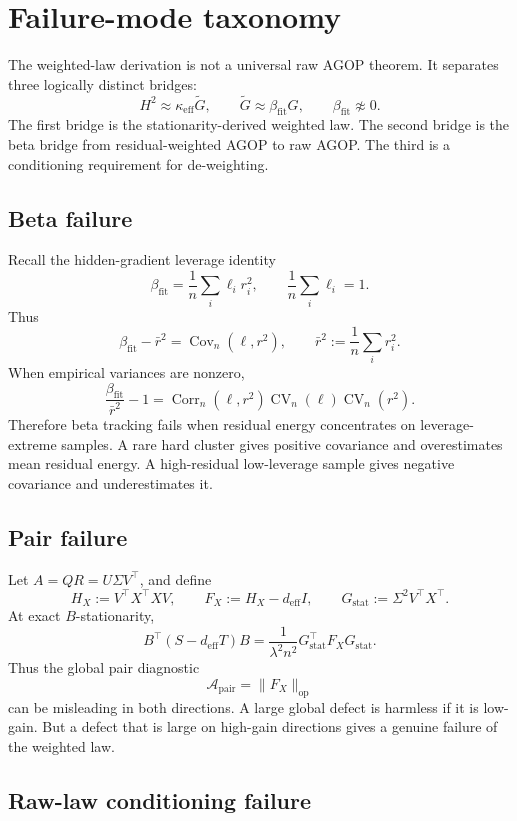 \section{Failure-mode taxonomy}
\label{sec:failure-modes}

The weighted-law derivation is not a universal raw AGOP theorem. It separates
three logically distinct bridges:
\[
H^2\approx \kappa_{\mathrm{eff}}\widetilde G,
\qquad
\widetilde G\approx \beta_{\mathrm{fit}}G,
\qquad
\beta_{\mathrm{fit}}\not\approx 0.
\]
The first bridge is the stationarity-derived weighted law. The second bridge is
the beta bridge from residual-weighted AGOP to raw AGOP. The third is a
conditioning requirement for de-weighting.

\subsection{Beta failure}

Recall the hidden-gradient leverage identity
\[
\beta_{\mathrm{fit}}
=
\frac1n\sum_i\ell_i r_i^2,
\qquad
\frac1n\sum_i\ell_i=1.
\]
Thus
\[
\beta_{\mathrm{fit}}-\bar r^2
=
\operatorname{Cov}_n(\ell,r^2),
\qquad
\bar r^2:=\frac1n\sum_i r_i^2.
\]
When empirical variances are nonzero,
\[
\frac{\beta_{\mathrm{fit}}}{\bar r^2}-1
=
\operatorname{Corr}_n(\ell,r^2)
\operatorname{CV}_n(\ell)
\operatorname{CV}_n(r^2).
\]
Therefore beta tracking fails when residual energy concentrates on
leverage-extreme samples. A rare hard cluster gives positive covariance and
overestimates mean residual energy. A high-residual low-leverage sample gives
negative covariance and underestimates it.

\subsection{Pair failure}

Let \(A=QR=U\Sigma V^\top\), and define
\[
H_X:=V^\top X^\top XV,
\qquad
F_X:=H_X-d_{\mathrm{eff}}I,
\qquad
G_{\mathrm{stat}}:=\Sigma^2V^\top X^\top.
\]
At exact \(B\)-stationarity,
\[
B^\top(S-d_{\mathrm{eff}}T)B
=
\frac1{\lambda^2n^2}
G_{\mathrm{stat}}^\top F_XG_{\mathrm{stat}}.
\]
Thus the global pair diagnostic
\[
\mathcal A_{\mathrm{pair}}=\|F_X\|_{\mathrm{op}}
\]
can be misleading in both directions. A large global defect is harmless if it is
low-gain. But a defect that is large on high-gain directions gives a genuine
failure of the weighted law.

\subsection{Raw-law conditioning failure}

